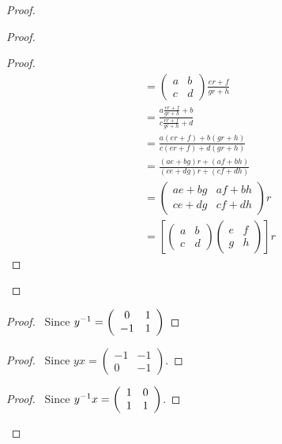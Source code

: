 \begin{proof}
\begin{proof}
\begin{proof}
\begin{align*}
		& = \left( \begin{array}{cc}
		a & b \\ c & d
		\end{array} \right)
		\frac{er+f}{gr+h} \\
		& = \frac{a\frac{er+f}{gr+h}+b}{c\frac{er+f}{gr+h}+d} \\
		& = \frac{a(er+f)+b(gr+h)}{c(er+f)+d(gr+h)} \\
		& = \frac{(ae+bg)r+(af+bh)}{(ce+dg)r+(cf+dh)} \\
		& = \left( \begin{array}{cc}
		ae+bg & af+bh \\ ce+dg & cf+dh
		\end{array} \right) r \\
		& = \left[ 
		\left( 
		\begin{array}{cc}
		a & b \\ c & d
		\end{array} 
		\right)
		\left( \begin{array}{cc}
		e & f \\ g & h
		\end{array} \right) 
		\right] 
		r
		\end{align*}
	\end{proof}
\end{proof}
\begin{proof}
	\pf\ Since ${y}^{-1} = \left( \begin{array}{cc}
	0 & 1 \\ -1 & 1
	\end{array} \right)$
\end{proof}
\begin{proof}
	\pf\ Since $yx = \left( \begin{array}{cc}
	-1 & -1 \\
	0 & -1
	\end{array} \right)$.
\end{proof}
\begin{proof}
	\pf\ Since ${y}^{-1}x = 
	\left( \begin{array}{cc}
	1 & 0 \\ 1 & 1
	\end{array} \right)
	$.
\end{proof}

\end{proof}
